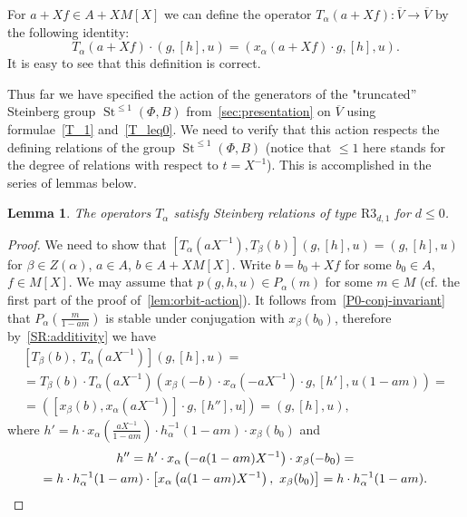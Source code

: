 \documentclass[oneside, 8pt]{amsart}
\newtheorem{lemma}{Lemma}
\theoremstyle{remark}
\theoremstyle{definition}
\numberwithin{lemma}{section}
\numberwithin{prop}{section}
\numberwithin{corollary}{section}
\DeclareMathOperator{\St}{St}
\numberwithin{equation}{section}
\begin{document}
For $a + Xf \in A + XM[X]$ we can define the operator $T_\alpha(a + Xf) \colon \overline{V} \to \overline{V}$ by the following identity:
\begin{equation} \label{T_leq0} T_\alpha(a + Xf) \cdot (g, [h], u) = (x_\alpha(a + Xf) \cdot g, [h], u).  \end{equation}
It is easy to see that this definition is correct.

Thus far we have specified the action of the generators of the "truncated'' Steinberg group $\St^{\leq 1}(\Phi, B)$ from~\cref{sec:presentation} on $\overline{V}$ using formulae~\eqref{T_1} and~\eqref{T_leq0}. We need to verify that this action respects the defining relations of the group $\St^{\leq 1}(\Phi, B)$ (notice that $\leq 1$ here stands for the degree of relations with respect to $t = X^{-1}$). This is accomplished in the series of lemmas below.

\begin{lemma} \label{R3_leq0_1} The operators $T_\alpha$ satisfy Steinberg relations of type $\mathrm{R3}_{d, 1}$ for $d\leq 0$. \end{lemma}
\begin{proof} We need to show that $[T_\alpha(aX^{-1}), T_\beta(b)](g, [h], u) = (g, [h], u)$ for $\beta\in Z(\alpha)$, $a\in A$, $b\in A + XM[X]$.
Write $b = b_0 + Xf$ for some $b_0 \in A$, $f \in M[X]$.
We may assume that $p(g, h, u) \in P_\alpha(m)$ for some $m \in M$  (cf. the first part of the proof of~\cref{lem:orbit-action}).
It follows from~\cref{P0-conj-invariant} that $P_\alpha\left(\tfrac{m}{1-am}\right)$ is stable under conjugation with $x_\beta(b_0)$, therefore by~\cref{SR:additivity} we have
\begin{multline} \nonumber
  \left[T_\beta(b),\ T_\alpha(aX^{-1}) \right] (g, [h], u) = \\
  = T_\beta(b) \cdot T_\alpha(aX^{-1}) \left(x_\beta(-b) \cdot x_\alpha(-aX^{-1}) \cdot g, [h'], u(1-am)\right) = \\ = \left( [x_\beta(b), x_{\alpha}(aX^{-1})] \cdot g, [h''], u] \right) = \left(g, [h], u\right), \end{multline}
where $h' = h \cdot x_{\alpha}\left(\tfrac{aX^{-1}}{1-am}\right) \cdot h^{-1}_\alpha(1-am) \cdot x_\beta(b_0)$ and
\begin{multline} \nonumber
 h'' = h' \cdot x_{\alpha}\left(-a(1-am)X^{-1}\right) \cdot x_{\beta}(-b_0) = \\
 = h \cdot h_\alpha^{-1}(1-am) \cdot \left[x_\alpha\left(a(1-am)X^{-1}\right),\ x_\beta(b_0)\right] = h \cdot h_\alpha^{-1}(1-am). \qedhere \end{multline}
\end{proof}
\end{document}
